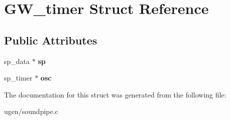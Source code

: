 \hypertarget{structGW__timer}{}\section{G\+W\+\_\+timer Struct Reference}
\label{structGW__timer}
\subsection*{Public Attributes}
\begin{DoxyCompactItemize}
\item 
\hypertarget{structGW__timer_a246d07ada54aaeddc5d8add4ab0e9260}{}\label{structGW__timer_a246d07ada54aaeddc5d8add4ab0e9260} 
sp\+\_\+data $\ast$ {\bfseries sp}
\item 
\hypertarget{structGW__timer_a67e31bfdb24df7761f8c5fb815e99e53}{}\label{structGW__timer_a67e31bfdb24df7761f8c5fb815e99e53} 
sp\+\_\+timer $\ast$ {\bfseries osc}
\end{DoxyCompactItemize}


The documentation for this struct was generated from the following file\+:\begin{DoxyCompactItemize}
\item 
ugen/soundpipe.\+c\end{DoxyCompactItemize}
